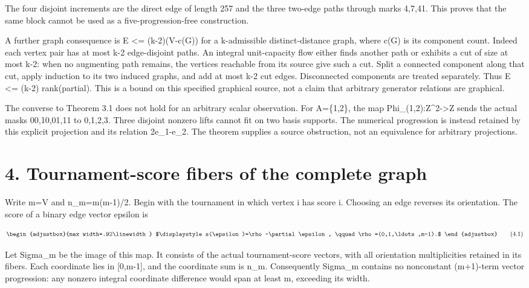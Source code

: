 The four disjoint increments are the direct edge of length 257 and the three two-edge paths through marks 4,7,41. This proves that the same block cannot be used as a five-progression-free construction.

A further graph consequence is \textbar E\textbar{} \textless= (k-2)(\textbar V\textbar-c(G)) for a k-admissible distinct-distance graph, where c(G) is its component count. Indeed each vertex pair has at most k-2 edge-disjoint paths. An integral unit-capacity flow either finds another path or exhibits a cut of size at most k-2: when no augmenting path remains, the vertices reachable from its source give such a cut. Split a connected component along that cut, apply induction to its two induced graphs, and add at most k-2 cut edges. Disconnected components are treated separately. Thus \textbar E\textbar{} \textless= (k-2) rank(partial). This is a bound on this specified graphical source, not a claim that arbitrary generator relations are graphical.

The converse to Theorem 3.1 does not hold for an arbitrary scalar observation. For A=\{1,2\}, the map Phi\_(1,2):Z\^{}2-\textgreater Z sends the actual masks 00,10,01,11 to 0,1,2,3. Three disjoint nonzero lifts cannot fit on two basis supports. The numerical progression is instead retained by this explicit projection and its relation 2e\_1-e\_2. The theorem supplies a source obstruction, not an equivalence for arbitrary projections.

\section{4. Tournament-score fibers of the complete graph}\label{n08-tournament-score-fibers-of-the-complete-graph}

Write m=\textbar V\textbar{} and n\_m=m(m-1)/2. Begin with the tournament in which vertex i has score i. Choosing an edge reverses its orientation. The score of a binary edge vector epsilon is

\[
\begin{adjustbox}{max width=.92\linewidth}
$\displaystyle s(\epsilon)=\rho-\partial\epsilon,
\qquad\rho=(0,1,\ldots,m-1).$
\end{adjustbox}
\tag{4.1}
\]

Let Sigma\_m be the image of this map. It consists of the actual tournament-score vectors, with all orientation multiplicities retained in its fibers. Each coordinate lies in {[}0,m-1{]}, and the coordinate sum is n\_m. Consequently Sigma\_m contains no nonconstant (m+1)-term vector progression: any nonzero integral coordinate difference would span at least m, exceeding its width.

